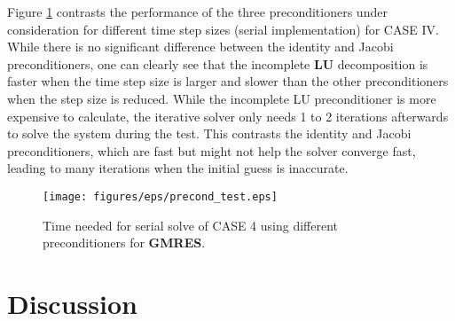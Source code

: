 Figure \ref{fig: preconditioners} contrasts the performance of the three preconditioners under consideration for different time step sizes (serial implementation) for CASE IV. While there is no significant difference between the identity and Jacobi preconditioners, one can clearly see that the incomplete \textbf{LU} decomposition is faster when the time step size is larger and slower than the other preconditioners when the step size is reduced. While the incomplete LU preconditioner is more expensive to calculate, the iterative solver only needs 1 to 2 iterations afterwards to solve the system during the test. This contrasts the identity and Jacobi preconditioners, which are fast  but might not help the solver converge fast, leading to many iterations when the initial guess is inaccurate.
 \begin{figure}[h]
    \centering
    \texttt{[image: figures/eps/precond\_test.eps]}
    \caption{Time needed for serial solve of CASE 4 using different preconditioners for \textbf{GMRES}.}
    \label{fig: preconditioners}
\end{figure}




\section{Discussion}

